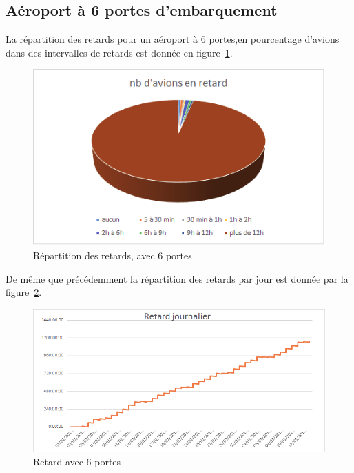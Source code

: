  \subsection{Aéroport à 6 portes d'embarquement}
La répartition des retards pour un aéroport à 6 portes,en pourcentage d'avions dans des intervalles de retards est donnée en figure~\ref{retard_camenbert_6}.
  \graphicspath{{donnees/graph_90jours/6portes/}}
\begin{figure}[H]
\centering \includegraphics[scale=0.6]{retard_avions.png}
 \caption{\label{retard_camenbert_6} Répartition des retards, avec 6 portes} 
\end{figure}
 
De même que précédemment la répartition des retards par jour est donnée par la figure~\ref{retard_jour_6}.
\begin{figure}[H]
\centering \includegraphics[scale=0.6]{retard_jour.png}
 \caption{\label{retard_jour_6} Retard avec 6 portes} 
\end{figure}
 

